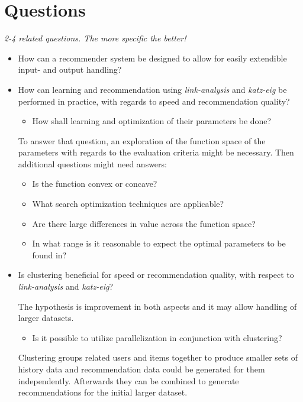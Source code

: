 
\section{Questions}\label{sec:intro:questions}

\textit{2-4 related questions. The more specific the better!}

\begin{itemize}

    \item How can a recommender system be designed to allow for easily extendible input- and output handling?


    \item How can learning and recommendation using \textit{link-analysis} and \textit{katz-eig} be performed in practice, with regards to speed and recommendation quality?

        \begin{itemize}
            \item How shall learning and optimization of their parameters be done?
        \end{itemize}

        To answer that question, an exploration of the function space of the parameters with regards to the evaluation criteria might be necessary. Then additional questions might need answers:

          \begin{itemize}
                \item Is the function convex or concave?
                \item What search optimization techniques are applicable?
                \item Are there large differences in value across the function space?
                \item In what range is it reasonable to expect the optimal parameters to be found in?
          \end{itemize}


    \item Is clustering beneficial for speed or recommendation quality, with respect to \textit{link-analysis} and \textit{katz-eig}?

          The hypothesis is improvement in both aspects and it may allow handling of larger datasets.

          \begin{itemize}
                \item Is it possible to utilize parallelization in conjunction with clustering?
          \end{itemize}

          Clustering groups related users and items together to produce smaller sets of history data and recommendation data could be generated for them independently. Afterwards they can be combined to generate recommendations for the initial larger dataset.

\end{itemize}

